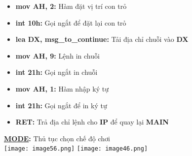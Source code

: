 \begin{itemize}
\begin{itemize}
            \item \textbf{mov AH, 2:} Hàm đặt vị trí con trỏ
            \item \textbf{int 10h:} Gọi ngắt để đặt lại con trỏ
            \item \textbf{lea DX, msg\_to\_continue:} Tải địa chỉ chuỗi vào \textbf{DX}
            \item \textbf{mov AH, 9:} Lệnh in chuỗi
            \item \textbf{int 21h:} Gọi ngắt in chuỗi
            \item \textbf{mov AH, 1:} Hàm nhập ký tự
            \item \textbf{int 21h:} Gọi ngắt để in ký tự 
            \item \textbf{RET:} Trả địa chỉ lệnh cho \textbf{IP} để quay lại \textbf{MAIN}
    \end{itemize}    
\end{itemize}


\textbf{\underline{MODE}: }Thủ tục chọn chế độ chơi\\
\texttt{[image: image56.png]}
\texttt{[image: image46.png]}

